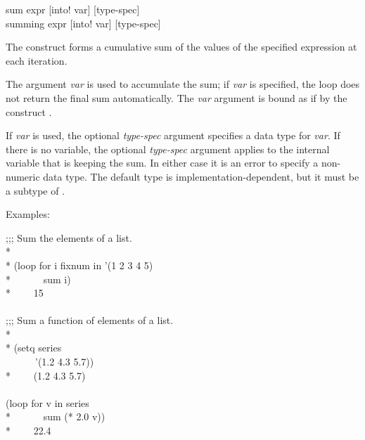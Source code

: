 \begin{defloop}
sum expr [\!into! var] [type-spec] \\
summing expr [\!into! var] [type-spec]

The  construct forms a cumulative sum of the values of the
specified expression at each iteration.

The argument {\it var\/} is used to accumulate
the sum; if {\it var} is specified, the loop
does not return the final sum automatically.  The {\it var\/} argument
is bound as if by the construct .

If  {\it var\/} is used, the optional
{\it type-spec\/} argument specifies a data type for {\it var\/}.
If there is no  variable, the optional {\it type-spec\/}
argument applies to the internal variable that is keeping the sum.
In either case it is an error to specify a non-numeric 
data type.
The default type is implementation-dependent, but it must be a subtype
of .

Examples:
\begin{lisp}
;;; Sum the elements of a list. \\*
\\*
(loop for i fixnum in '(1 2 3 4 5) \\*
~~~~~~sum i) \\*
~~~\EV~15 \\
\\
;;; Sum a function of elements of a list. \\*
\\*
(setq series \\
~~~~~~'(1.2 4.3 5.7)) \\*
~~~\EV~(1.2 4.3 5.7) \\
\\
(loop for v in series  \\*
~~~~~~sum (* 2.0 v)) \\*
~~~\EV~22.4
\end{lisp}
\end{defloop}


